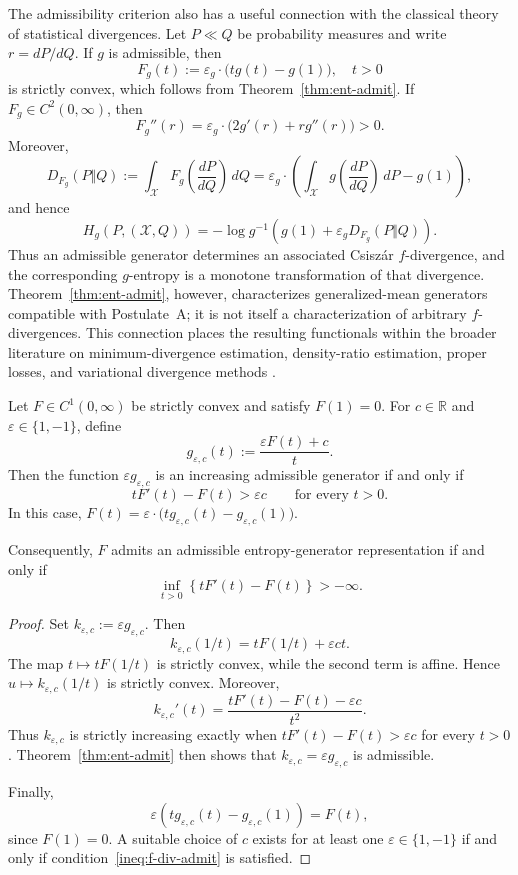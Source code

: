 \documentclass[reqno]{amsart}
\begin{document}
The admissibility criterion also has a useful connection with the classical
theory of statistical divergences. Let $P\ll Q$ be probability measures
and write $r=dP/dQ$. If $g$ is admissible, then
$$
F_g(t):=\varepsilon_g\cdot \big(t g(t)-g(1) \big), \quad t>0
$$
is strictly convex, which follows from Theorem~\ref{thm:ent-admit}. If $F_g \in C^2(0, \infty)$, then
$$
F_g''(r)= \varepsilon_g\cdot \big(2g'(r)+r g''(r)\big) >0.
$$
Moreover,
$$
D_{F_g}(P\Vert Q)
:=
\int_{\mathcal{X}}
F_g\left(\frac{dP}{dQ}\right)\,dQ
=
\varepsilon_g\cdot \left(\int_{\mathcal{X}}
g\left(\frac{dP}{dQ}\right)\,dP-g(1) \right),
$$
and hence
$$
H_g(P,(\mathcal{X},Q))
=
-\log
g^{-1}\left(
g(1)+\varepsilon_gD_{F_g}(P\Vert Q)
\right).
$$
Thus an admissible generator determines an associated Csisz\'ar
$f$-divergence, and the corresponding $g$-entropy is a monotone
transformation of that divergence. Theorem~\ref{thm:ent-admit}, however,
characterizes generalized-mean generators compatible with Postulate~A;
it is not itself a characterization of arbitrary $f$-divergences. This connection places the resulting functionals within the broader literature
on minimum-divergence estimation, density-ratio estimation, proper losses,
and variational divergence methods
\cite{Csiszar67,NguWaiJor10,ReidWill11,NowCseTom16}.


\begin{prop}
\label{prop:f-divergence-representation}
Let $F\in C^1(0,\infty)$ be strictly convex and satisfy
$F(1)=0$. For $c\in\mathbb R$ and $\varepsilon \in \{1, -1\}$, define
$$
g_{\varepsilon,c}(t):=\frac{\varepsilon F(t)+c}{t}.
$$
Then the function $\varepsilon g_{\varepsilon,c}$ is an increasing admissible generator if and only if
$$
t  F'(t) - F(t)> \varepsilon c
\qquad
\text{for every }t>0.
$$
In this case, $F(t)=\varepsilon \cdot\big(tg_{\varepsilon,c}(t)-g_{\varepsilon,c}(1) \big)$.

Consequently, $F$ admits an admissible entropy-generator
representation if and only if
\begin{equation}
\label{ineq:f-div-admit}
\inf_{t>0}
\left\{
t F'(t)-F(t)
\right\} > -\infty.
\end{equation}
\end{prop}

\begin{proof}
Set
$k_{\varepsilon,c}
:=
\varepsilon g_{\varepsilon,c}$.
Then
$$
k_{\varepsilon,c}(1/t)
=
t F(1/t)+\varepsilon ct.
$$
The map $t \mapsto t F(1/t)$ is strictly convex, while the second term is affine. Hence
$u\mapsto k_{\varepsilon,c}(1/t)$ is strictly convex.
Moreover,
$$
k_{\varepsilon,c}'(t)
=
\frac{
tF'(t)-F(t)-\varepsilon c
}{t^2}.
$$
Thus $k_{\varepsilon,c}$ is strictly increasing exactly when
$tF'(t)-F(t)>\varepsilon c$
for every $t>0$.
Theorem~\ref{thm:ent-admit} then shows that
$k_{\varepsilon,c}=\varepsilon g_{\varepsilon,c}$ is admissible.

Finally,
$$
\varepsilon
\left(
tg_{\varepsilon,c}(t)-g_{\varepsilon,c}(1)
\right)
=
F(t),
$$
since $F(1)=0$. A suitable choice of $c$ exists for at least one
$\varepsilon\in\{1,-1\}$ if and only if
condition~\eqref{ineq:f-div-admit} is satisfied.
\end{proof}
\end{document}
